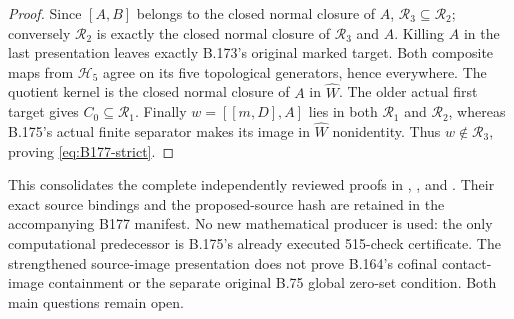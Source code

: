 \begin{proof}
Since \([A,B]\) belongs to the closed normal closure of \(A\),
\(\mathcal R_3\subseteq\mathcal R_2\); conversely
\(\mathcal R_2\) is exactly the closed normal closure of
\(\mathcal R_3\) and \(A\). Killing \(A\) in the last
presentation leaves exactly B.173's original marked target.
Both composite maps from \(\mathcal H_5\) agree on its five
topological generators, hence everywhere. The quotient kernel is
the closed normal closure of \(A\) in \(\widehat W\).
The older actual first target gives \(C_0\subseteq\mathcal R_1\).
Finally \(w=[[m,D],A]\) lies in both \(\mathcal R_1\) and
\(\mathcal R_2\), whereas B.175's actual finite separator makes
its image in \(\widehat W\) nonidentity. Thus \(w\notin
\mathcal R_3\), proving \eqref{eq:B177-strict}.
\end{proof}

\begingroup\footnotesize\raggedright
This consolidates the complete independently reviewed proofs in
,
, and
.
Their exact source bindings and the proposed-source hash are retained
in the accompanying B177 manifest. No new mathematical producer is
used: the only computational predecessor is B.175's already executed
515-check certificate. The strengthened source-image presentation
does not prove B.164's cofinal contact-image containment or the separate
original B.75 global zero-set condition. Both main questions remain open.
\par\endgroup
